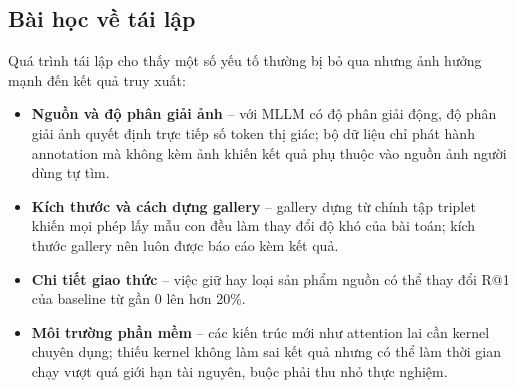 \subsection{Bài học về tái lập}

Quá trình tái lập cho thấy một số yếu tố thường bị bỏ qua nhưng ảnh hưởng mạnh đến kết quả truy xuất:
\begin{itemize}
    \item \textbf{Nguồn và độ phân giải ảnh} -- với MLLM có độ phân giải động, độ phân giải ảnh quyết định trực tiếp số token thị giác; bộ dữ liệu chỉ phát hành annotation mà không kèm ảnh khiến kết quả phụ thuộc vào nguồn ảnh người dùng tự tìm.
    \item \textbf{Kích thước và cách dựng gallery} -- gallery dựng từ chính tập triplet khiến mọi phép lấy mẫu con đều làm thay đổi độ khó của bài toán; kích thước gallery nên luôn được báo cáo kèm kết quả.
    \item \textbf{Chi tiết giao thức} -- việc giữ hay loại sản phẩm nguồn có thể thay đổi R@1 của baseline từ gần 0 lên hơn 20\%.
    \item \textbf{Môi trường phần mềm} -- các kiến trúc mới như attention lai cần kernel chuyên dụng; thiếu kernel không làm sai kết quả nhưng có thể làm thời gian chạy vượt quá giới hạn tài nguyên, buộc phải thu nhỏ thực nghiệm.
\end{itemize}


